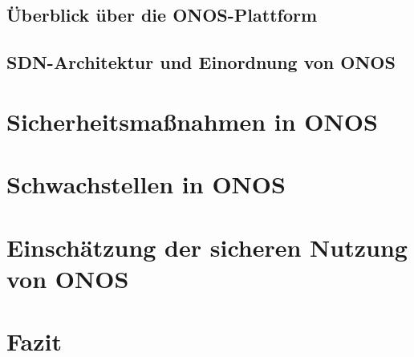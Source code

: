 \subsection{Überblick über die ONOS-Plattform}
\cite{ohri_security_2023}
\subsection{SDN-Architektur und Einordnung von ONOS}

\newpage

\section{Sicherheitsmaßnahmen in ONOS}

\newpage
\section{Schwachstellen in ONOS}

\newpage
\section{Einschätzung der sicheren Nutzung von ONOS}

\newpage
\section{Fazit}


\pagebreak
\renewcommand\bibname{Literaturverzeichnis}


